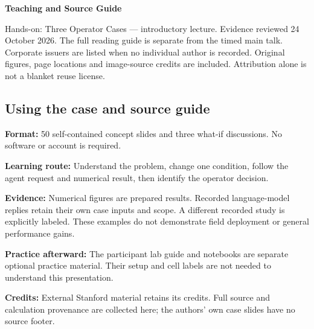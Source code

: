 \documentclass[10pt,letterpaper]{article}
\begin{document}
{\LARGE\bfseries Teaching and Source Guide}\par
Hands-on: Three Operator Cases --- introductory lecture. Evidence reviewed 24 October 2026. The full reading guide is separate from the timed main talk. Corporate issuers are listed when no individual author is recorded. Original figures, page locations and image-source credits are included. Attribution alone is not a blanket reuse license.\par
\subsection*{Using the case and source guide}
\textbf{Format:} 50 self-contained concept slides and three what-if discussions. No software or account is required.\par
\textbf{Learning route:} Understand the problem, change one condition, follow the agent request and numerical result, then identify the operator decision.\par
\textbf{Evidence:} Numerical figures are prepared results. Recorded language-model replies retain their own case inputs and scope. A different recorded study is explicitly labeled. These examples do not demonstrate field deployment or general performance gains.\par
\textbf{Practice afterward:} The participant lab guide and notebooks are separate optional practice material. Their setup and cell labels are not needed to understand this presentation.\par
\textbf{Credits:} External Stanford material retains its credits. Full source and calculation provenance are collected here; the authors' own case slides have no source footer.\par
\par\medskip
\end{document}
